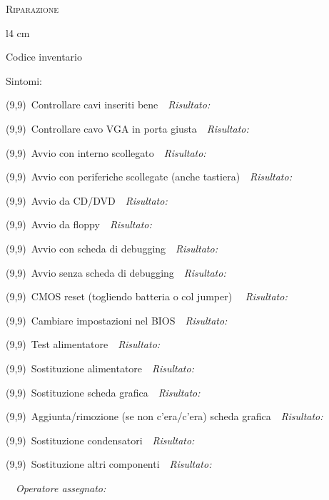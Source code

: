 \documentclass[a4paper,12pt,twoside]{article}
\newcommand{\rulespace}[1]{\ \ \textit{\small #1} \hrulefill\par}
\renewcommand{\r}{\rulespace{Risultato:}}
\renewcommand{\c}{\framebox(9,9){}\, }
\begin{document}
\thispagestyle{empty}
{\Large\textsc{Riparazione}}\par
\begin{wrapfigure}{l}{4 cm}
	\vspace{-0.5cm}
	\begin{framed}
		\begin{centering}
		{\footnotesize Codice inventario\par}
		\vspace{2.4cm}
		\end{centering}		
	\end{framed}
	\vspace{-1.4cm}
\end{wrapfigure}
Sintomi: \hrulefill\par
\hrulefill\par
\c Controllare cavi inseriti bene\r
\c Controllare cavo VGA in porta giusta\r
\c Avvio con interno scollegato\r
\c Avvio con periferiche scollegate (anche tastiera)\r
\c Avvio da CD/DVD\r
\c Avvio da floppy\r
\c Avvio con scheda di debugging\r
\c Avvio senza scheda di debugging\r
\c CMOS reset (togliendo batteria o col jumper) \r
\c Cambiare impostazioni nel BIOS\r
\c Test alimentatore\r
\c Sostituzione alimentatore\r
\c Sostituzione scheda grafica\r
\c Aggiunta/rimozione (se non c'era/c'era) scheda grafica\r
\c Sostituzione condensatori\r
\c Sostituzione altri componenti\r
\rulespace{Operatore assegnato:}
\end{document}
